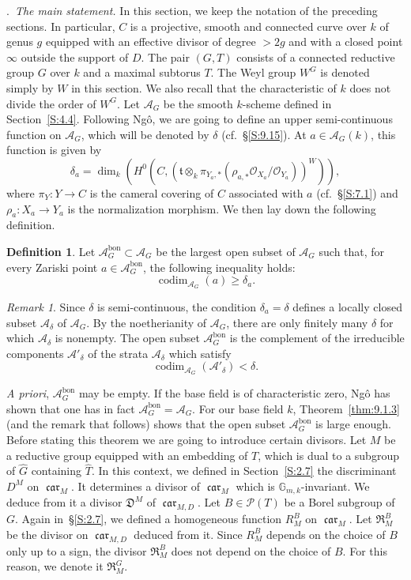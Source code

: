 \documentclass[12pt,a4paper,oneside,english,leqno]{smfart}
\makeatletter
\numberwithin{equation}{subsection}
\newcounter{theo}
\numberwithin{theo}{subsection}
\newenvironment{paragr}[1][]{\medskip\refstepcounter{subsection}%
  \par\noindent\hspace*{\parindent}\thesubsection.\ \emph{#1}%
  \@ifundefined{@empty}{}{}\ignorespaces}{\medskip}
\theoremstyle{plain}
\theoremstyle{definition}
\newtheorem{definition}[theo]{Definition}
\theoremstyle{remark}
\newtheorem{remark}[theo]{Remark}
\DeclareMathOperator{\car}{\mathfrak{car}}
\newcommand{\Gmk}{\mathbb{G}_{m,k}}
\newcommand{\oc}{\mathcal{O}}
\newcommand{\pc}{\mathcal{P}}
\newcommand{\Ac}{\mathcal{A}}
\newcommand{\Gc}{\widehat{G}}
\newcommand{\Tc}{\widehat{T}}
\newcommand{\tgo}{\mathfrak{t}}
\renewcommand{\geq}{\geqslant}
\makeatother
\begin{document}
\begin{paragr}[The main statement.]\label{S:9.1}
In this section, we keep the notation of the preceding sections. In particular, $C$ is a projective, smooth and connected curve over $k$ of genus $g$ equipped with an effective divisor of degree $>2g$ and with a closed point $\infty$ outside the support of $D$. The pair $(G,T)$ consists of a connected reductive group $G$ over $k$ and a maximal subtorus $T$. The Weyl group $W^G$ is denoted simply by $W$ in this section. We also recall that the characteristic of $k$ does not divide the order of $W^G$. Let $\Ac_G$ be the smooth $k$-scheme defined in Section~\ref{S:4.4}. Following Ng\^o, we are going to define an upper semi-continuous function on $\Ac_G$, which will be denoted by $\delta$ (cf.\ \S\ref{S:9.15}). At $a\in\Ac_G(k)$, this function is given by
\[
\delta_a=\dim_k(H^0(C,(\tgo\otimes_k\pi_{Y_a,*}(\rho_{a,*}\oc_{X_a}/\oc_{Y_a}))^W)),
\]
where $\pi_Y:Y\to C$ is the cameral covering of $C$ associated with $a$ (cf.\ \S\ref{S:7.1}) and $\rho_a:X_a\to Y_a$ is the normalization morphism. We then lay down the following definition.

\begin{definition}\label{thm:9.1.1}
Let $\Ac_G^{\mathrm{bon}}\subset\Ac_G$ be the largest open subset of $\Ac_G$ such that, for every Zariski point $a\in\Ac_G^{\mathrm{bon}}$, the following inequality holds:
\[
\operatorname{codim}_{\Ac_G}(a)\geq\delta_a.
\]
\end{definition}

\begin{remark}\label{thm:9.1.2}
Since $\delta$ is semi-continuous, the condition $\delta_a=\delta$ defines a locally closed subset $\Ac_\delta$ of $\Ac_G$. By the noetherianity of $\Ac_G$, there are only finitely many $\delta$ for which $\Ac_\delta$ is nonempty. The open subset $\Ac_G^{\mathrm{bon}}$ is the complement of the irreducible components $\Ac'_\delta$ of the strata $\Ac_\delta$ which satisfy
\[
\operatorname{codim}_{\Ac_G}(\Ac'_\delta)<\delta.
\]
\end{remark}

\emph{A priori}, $\Ac_G^{\mathrm{bon}}$ may be empty. If the base field is of characteristic zero, Ng\^o has shown that one has in fact $\Ac_G^{\mathrm{bon}}=\Ac_G$. For our base field $k$, Theorem~\ref{thm:9.1.3} (and the remark that follows) shows that the open subset $\Ac_G^{\mathrm{bon}}$ is large enough. Before stating this theorem we are going to introduce certain divisors. Let $M$ be a reductive group equipped with an embedding of $T$, which is dual to a subgroup of $\Gc$ containing $\Tc$. In this context, we defined in Section~\ref{S:2.7} the discriminant $D^M$ on $\car_M$. It determines a divisor of $\car_M$ which is $\Gmk$-invariant. We deduce from it a divisor $\mathfrak{D}^M$ of $\car_{M,D}$. Let $B\in\pc(T)$ be a Borel subgroup of $G$. Again in~\S\ref{S:2.7}, we defined a homogeneous function $R_M^B$ on $\car_M$. Let $\mathfrak{R}_M^B$ be the divisor on $\car_{M,D}$ deduced from it. Since $R_M^B$ depends on the choice of $B$ only up to a sign, the divisor $\mathfrak{R}_M^B$ does not depend on the choice of $B$. For this reason, we denote it $\mathfrak{R}_M^G$.
\end{paragr}
\end{document}
